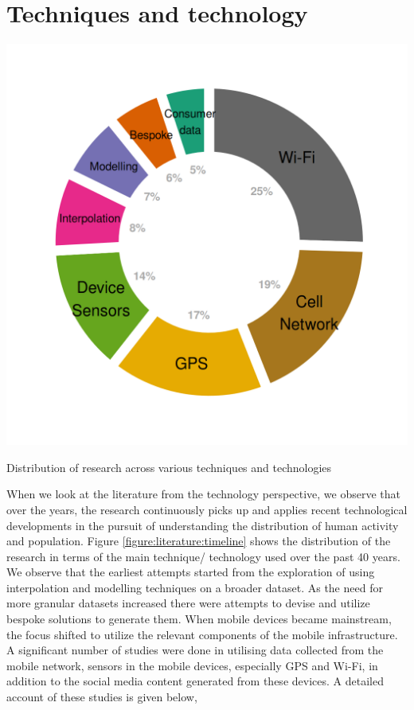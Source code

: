 \section{Techniques and technology}\label{section:literature:technology}

\begin{marginfigure}
  \forcerectofloat
  \includegraphics[trim={1.1cm 1cm 1cm 1cm},clip]{images/literature-technology.png}
  \caption{Distribution of research across various techniques and technologies}
  \label{figure:literature:timeline}
\end{marginfigure}

When we look at the literature from the technology perspective, we observe that over the years, the research continuously picks up and applies recent technological developments in the pursuit of understanding the distribution of human activity and population.
Figure \ref{figure:literature:timeline} shows the distribution of the research in terms of the main technique/ technology used over the past 40 years.
We observe that the earliest attempts started from the exploration of using interpolation and modelling techniques on a broader dataset.
As the need for more granular datasets increased there were attempts to devise and utilize bespoke solutions to generate them.
When mobile devices became mainstream, the focus shifted to utilize the relevant components of the mobile infrastructure.
A significant number of studies were done in utilising data collected from the mobile network, sensors in the mobile devices, especially GPS and Wi-Fi, in addition to the social media content generated from these devices.
A detailed account of these studies is given below,

